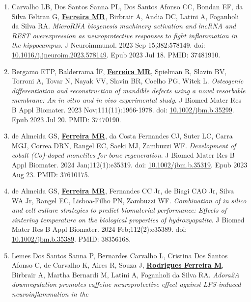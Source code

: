 \documentclass[
  letterpaper,
  DIV=11,
  numbers=noendperiod]{scrartcl}
\begin{document}
\begin{enumerate}
  LH, Buzalaf CP, de Oliveira RC. The \emph{Multifarious Functions of
  Leukotrienes in Bone Metabolism}. J Bone Miner Res. 2023
  Aug;38(8):1135-1153. doi:
  \href{https://www.doi.org/10.1002/jbmr.4867}{10.1002/jbmr.4867}. Epub
  2023 Jun 29. PMID: 37314430.
\item
  Carvalho LB, Dos Santos Sanna PL, Dos Santos Afonso CC, Bondan EF, da
  Silva Feltran G, \ul{\textbf{Ferreira MR}}, Birbrair A, Andia DC,
  Latini A, Foganholi da Silva RA. \emph{MicroRNA biogenesis machinery
  activation and lncRNA and REST overexpression as neuroprotective
  responses to fight inflammation in the hippocampus}. J Neuroimmunol.
  2023 Sep 15;382:578149. doi:
  \href{https://doi.org/10.1016/j.jneuroim.2023.578149}{10.1016/j.jneuroim.2023.578149}.
  Epub 2023 Jul 18. PMID: 37481910.
\item
  Bergamo ETP, Balderrama ÍF, \ul{\textbf{Ferreira MR}}, Spielman R,
  Slavin BV, Torroni A, Tovar N, Nayak VV, Slavin BR, Coelho PG, Witek
  L. \emph{Osteogenic differentiation and reconstruction of mandible
  defects using a novel resorbable membrane: An in vitro and in vivo
  experimental study}. J Biomed Mater Res B Appl Biomater. 2023
  Nov;111(11):1966-1978. doi:
  \href{https://doi.org/10.1002/jbm.b.35299}{10.1002/jbm.b.35299}. Epub
  2023 Jul 20. PMID: 37470190.
\item
  de Almeida GS, \ul{\textbf{Ferreira MR}}, da Costa Fernandes CJ, Suter
  LC, Carra MGJ, Correa DRN, Rangel EC, Saeki MJ, Zambuzzi WF.
  \emph{Development of cobalt (Co)-doped monetites for bone
  regeneration}. J Biomed Mater Res B Appl Biomater. 2024
  Jan;112(1):e35319. doi:
  \href{https://www.doi.org/10.1002/jbm.b.35319}{10.1002/jbm.b.35319}.
  Epub 2023 Aug 23. PMID: 37610175.
\item
  de Almeida GS, \ul{\textbf{Ferreira MR}}, Fernandes CC Jr, de Biagi
  CAO Jr, Silva WA Jr, Rangel EC, Lisboa-Filho PN, Zambuzzi WF.
  \emph{Combination of in silico and cell culture strategies to predict
  biomaterial performance: Effects of sintering temperature on the
  biological properties of hydroxyapatite}. J Biomed Mater Res B Appl
  Biomater. 2024 Feb;112(2):e35389. doi:
  \href{https://www.doi.org/10.1002/jbm.b.35389}{10.1002/jbm.b.35389}.
  PMID: 38356168.
\item
  Lemes Dos Santos Sanna P, Bernardes Carvalho L, Cristina Dos Santos
  Afonso C, de Carvalho K, Aires R, Souza J, \ul{\textbf{Rodrigues
  Ferreira M}}, Birbrair A, Martha Bernardi M, Latini A, Foganholi da
  Silva RA. \emph{Adora2A downregulation promotes caffeine
  neuroprotective effect against LPS-induced neuroinflammation in the
}
\end{enumerate}
\end{document}
